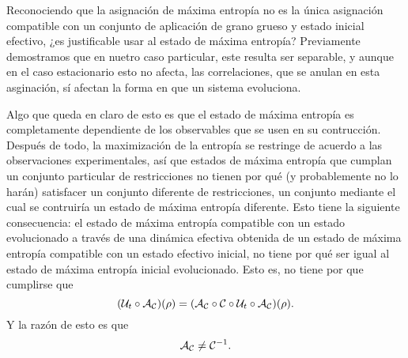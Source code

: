 Reconociendo que la asignación de máxima entropía no es la única asignación compatible con un conjunto de aplicación de grano grueso y estado inicial efectivo, ¿es justificable usar al estado de máxima entropía? Previamente demostramos que en nuetro caso particular, este resulta ser separable, y aunque en el caso estacionario esto no afecta, las correlaciones, que se anulan en esta asginación, sí afectan la forma en que un sistema evoluciona.

Algo que queda en claro de esto es que el estado de máxima entropía es completamente dependiente de los observables que se usen en su contrucción. Después de todo, la maximización de la entropía se restringe de acuerdo a las observaciones experimentales, así que estados de máxima entropía que cumplan un conjunto particular de restricciones no tienen por qué (y probablemente no lo harán) satisfacer un conjunto diferente de restricciones, un conjunto mediante el cual se contruiría un estado de máxima entropía diferente. Esto tiene la siguiente consecuencia: el estado de máxima entropía compatible con un estado evolucionado a través de una dinámica efectiva obtenida de un estado de máxima entropía compatible con un estado efectivo inicial, no tiene por qué ser igual al estado de máxima entropía inicial evolucionado. Esto es, no tiene por que cumplirse que
\begin{equation*}
    (\mathcal{U}_{t}\circ\mathcal{A}_{\mathcal{C}})(\rho) = (\mathcal{A}_{\mathcal{C}}\circ\mathcal{C} \circ \mathcal{U}_t \circ \mathcal{A}_{\mathcal{C}})(\rho).
\end{equation*}
Y la razón de esto es que
\begin{equation*}
    \mathcal{A}_{\mathcal{C}}\neq\mathcal{C}^{-1}.
\end{equation*}

